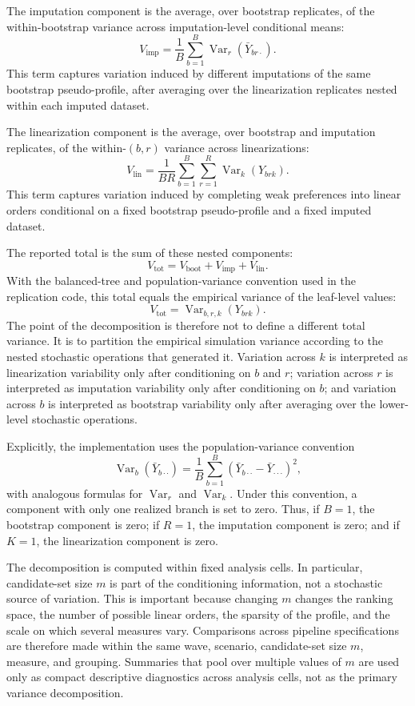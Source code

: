 \documentclass[12pt]{article}
\begin{document}
The imputation component is the average, over bootstrap replicates, of the
within-bootstrap variance across imputation-level conditional means:
\[
V_{\mathrm{imp}}
=
\frac{1}{B}\sum_{b=1}^B
\operatorname{Var}_r(\bar Y_{br\cdot}).
\]
This term captures variation induced by different imputations of the same
bootstrap pseudo-profile, after averaging over the linearization replicates
nested within each imputed dataset.

The linearization component is the average, over bootstrap and imputation
replicates, of the within-\((b,r)\) variance across linearizations:
\[
V_{\mathrm{lin}}
=
\frac{1}{BR}
\sum_{b=1}^B\sum_{r=1}^R
\operatorname{Var}_k(Y_{brk}).
\]
This term captures variation induced by completing weak preferences into
linear orders conditional on a fixed bootstrap pseudo-profile and a fixed
imputed dataset.

The reported total is the sum of these nested components:
\[
V_{\mathrm{tot}}
=
V_{\mathrm{boot}}
+
V_{\mathrm{imp}}
+
V_{\mathrm{lin}}.
\]
With the balanced-tree and population-variance convention used in the
replication code, this total equals the empirical variance of the leaf-level
values:
\[
V_{\mathrm{tot}}
=
\operatorname{Var}_{b,r,k}(Y_{brk}).
\]
The point of the decomposition is therefore not to define a different total
variance. It is to partition the empirical simulation variance according to the
nested stochastic operations that generated it. Variation across \(k\) is
interpreted as linearization variability only after conditioning on \(b\) and
\(r\); variation across \(r\) is interpreted as imputation variability only
after conditioning on \(b\); and variation across \(b\) is interpreted as
bootstrap variability only after averaging over the lower-level stochastic
operations.

Explicitly, the implementation uses the population-variance convention
\[
\operatorname{Var}_b(\bar Y_{b\cdot\cdot})
=
\frac{1}{B}
\sum_{b=1}^B
\left(
\bar Y_{b\cdot\cdot}
-
\bar Y_{\cdot\cdot\cdot}
\right)^2,
\]
with analogous formulas for \(\operatorname{Var}_r\) and
\(\operatorname{Var}_k\). Under this convention, a component with only one
realized branch is set to zero. Thus, if \(B=1\), the bootstrap component is
zero; if \(R=1\), the imputation component is zero; and if \(K=1\), the
linearization component is zero.

The decomposition is computed within fixed analysis cells. In particular,
candidate-set size \(m\) is part of the conditioning information, not a
stochastic source of variation. This is important because changing \(m\) changes
the ranking space, the number of possible linear orders, the sparsity of the
profile, and the scale on which several measures vary. Comparisons across
pipeline specifications are therefore made within the same wave, scenario,
candidate-set size \(m\), measure, and grouping. Summaries that pool over
multiple values of \(m\) are used only as compact descriptive diagnostics across
analysis cells, not as the primary variance decomposition.
\end{document}

